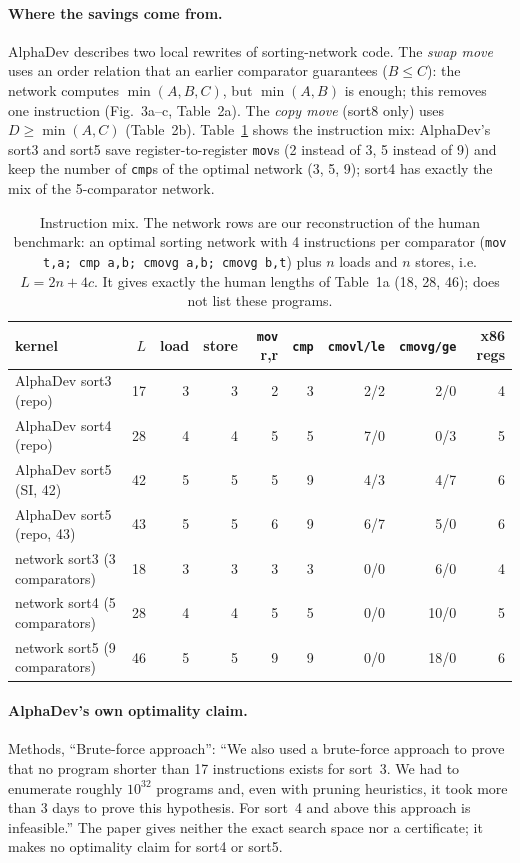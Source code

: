 \paragraph{Where the savings come from.}
AlphaDev describes two local rewrites of sorting-network code. The \emph{swap move} uses an order relation that an earlier
comparator guarantees ($B \le C$): the network computes $\min(A,B,C)$, but $\min(A,B)$ is enough; this removes one
instruction (Fig.~3a--c, Table~2a). The \emph{copy move} (sort8 only) uses $D \ge \min(A,C)$ (Table~2b). Table~\ref{tab:mix}
shows the instruction mix: AlphaDev's sort3 and sort5 save register-to-register \texttt{mov}s (2 instead of 3, 5 instead of 9)
and keep the number of \texttt{cmp}s of the optimal network (3, 5, 9); sort4 has exactly the mix of the 5-comparator network.

\begin{table}[h]\centering\small\setlength{\tabcolsep}{4pt}
\begin{tabular}{lrrrrrrrr}\toprule
kernel & $L$ & load & store & \texttt{mov} r,r & \texttt{cmp} & \texttt{cmovl/le} & \texttt{cmovg/ge} & x86 regs \\\midrule
AlphaDev sort3 (repo) & 17 & 3 & 3 & 2 & 3 & 2/2 & 2/0 & 4 \\
AlphaDev sort4 (repo) & 28 & 4 & 4 & 5 & 5 & 7/0 & 0/3 & 5 \\
AlphaDev sort5 (SI, 42) & 42 & 5 & 5 & 5 & 9 & 4/3 & 4/7 & 6 \\
AlphaDev sort5 (repo, 43) & 43 & 5 & 5 & 6 & 9 & 6/7 & 5/0 & 6 \\\midrule
network sort3 (3 comparators) & 18 & 3 & 3 & 3 & 3 & 0/0 & 6/0 & 4 \\
network sort4 (5 comparators) & 28 & 4 & 4 & 5 & 5 & 0/0 & 10/0 & 5 \\
network sort5 (9 comparators) & 46 & 5 & 5 & 9 & 9 & 0/0 & 18/0 & 6 \\\bottomrule
\end{tabular}
\caption{Instruction mix. The network rows are our reconstruction of the human benchmark: an optimal sorting network with
4 instructions per comparator (\texttt{mov t,a; cmp a,b; cmovg a,b; cmovg b,t}) plus $n$ loads and $n$ stores, i.e.
$L = 2n + 4c$. It gives exactly the human lengths of Table~1a (18, 28, 46); \cite{alphadev} does not list these programs.}
\label{tab:mix}
\end{table}

\paragraph{AlphaDev's own optimality claim.}
Methods, ``Brute-force approach'': ``We also used a brute-force approach to prove that no program shorter than 17 instructions
exists for sort~3. We had to enumerate roughly $10^{32}$ programs and, even with pruning heuristics, it took more than 3 days
to prove this hypothesis. For sort~4 and above this approach is infeasible.'' The paper gives neither the exact search space
nor a certificate; it makes no optimality claim for sort4 or sort5.

